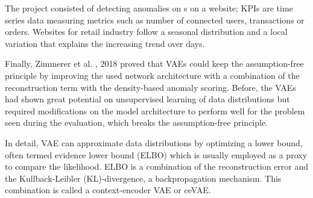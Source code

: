 The project consisted of detecting anomalies on s on a website; KPIs are time series data measuring metrics such as number of connected users, transactions or orders. Websites for retail industry follow a seasonal distribution and a local variation that explains the increasing trend over days.

Finally, Zimmerer et al. \cite{zimmereretal}, 2018 proved that VAEs could keep the assumption-free principle by improving the used network architecture with a combination of the reconstruction term with the density-based anomaly scoring. Before, the VAEs had shown great potential on unsupervised learning of data distributions but required modifications on the model architecture to perform well for the problem seen during the evaluation, which breaks the assumption-free principle. 

In detail, VAE can approximate data distributions by optimizing a lower bound, often termed evidence lower bound (ELBO) which is usually employed as a proxy to compare the likelihood. ELBO is a combination of the reconstruction error and the Kullback-Leibler (KL)-divergence, a backpropagation mechanism. This combination is called a context-encoder VAE or ceVAE.

